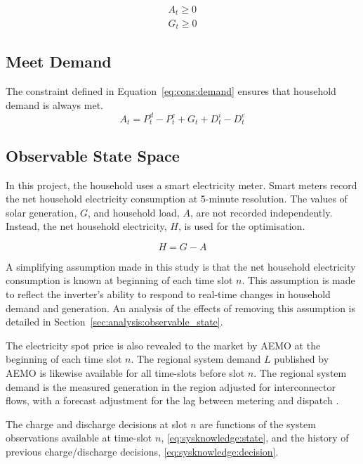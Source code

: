 \begin{subequations}
    \label{eq:cons:unidirec}
    \begin{align}
        A_t \geq 0 \\
        G_t \geq 0
    \end{align}
\end{subequations}

\subsection{Meet Demand}
The constraint defined in Equation~\ref{eq:cons:demand} ensures that household demand is always met.
\begin{equation}
    \label{eq:cons:demand}
    A_t = P^d_t - P^c_t + G_t + D^i_t - D^e_t
\end{equation}

\subsection{Observable State Space}
In this project, the household uses a smart electricity meter. Smart meters record the net
household electricity consumption at 5-minute resolution. The values of solar generation, $G$, and household load, $A$, are not recorded independently. Instead, the net household electricity, $H$, is used for the optimisation.

\begin{equation}
    H = G-A
\end{equation}

A simplifying assumption made in this study is that the net household electricity consumption is known at beginning of each time slot $n$. This assumption is made to reflect the inverter's ability to respond to real-time changes in household demand and generation. An analysis of the effects of removing this assumption is detailed in Section~\ref{sec:analysis:observable_state}.

The electricity spot price is also revealed to the market by AEMO at the beginning
of each time slot $n$. The regional system demand $L$ published by AEMO is likewise
available for all time-slots before slot $n$. The regional system demand is the measured generation in the region adjusted for interconnector flows, with a forecast adjustment for the lag between metering and dispatch \cite{openelectricity_demand}.

The charge and discharge decisions at slot $n$ are functions of the system observations
available at time-slot $n$, \eqref{eq:sysknowledge:state}, and the history of previous
charge/discharge decisions, \eqref{eq:sysknowledge:decision}.

